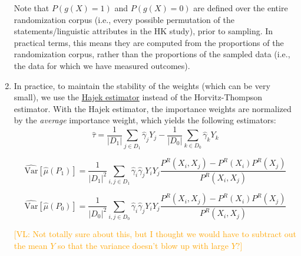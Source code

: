 \documentclass{article}
\newcommand{\vl}[1]{\textcolor{orange}{[VL: #1]}}
\begin{document}
\begin{enumerate}
    Note that $P(g(X)=1)$ and $P(g(X)=0)$ are defined over the entire randomization corpus (i.e., every possible permutation of the statements/linguistic attributes in the HK study), prior to sampling. In practical terms, this means they are computed from the  proportions of the randomization corpus, rather than the  proportions of the sampled data (i.e., the data for which we have measured outcomes).
    \item In practice, to maintain the stability of the weights (which can be very small), we use the \href{https://cran.r-project.org/web/packages/sampling/vignettes/HT_Hajek_estimators.pdf}{Hajek estimator} instead of the Horvitz-Thompson estimator. With the Hajek estimator, the importance weights are normalized by the \textit{average} importance weight, which yields the following estimators:
    \begin{equation*}
        \hat{\tau} = \frac{1}{|D_1|} \sum_{j \in D_1} \hat{\gamma}_j Y_j - \frac{1}{|D_0|} \sum_{k \in D_0} \hat{\gamma}_k Y_k
    \end{equation*}
    

    \begin{equation*}
        \widehat{\text{Var}}[\hat{\mu}(P_1)] = \frac{1}{|D_1|^2} \sum_{i,j \in D_1} \hat{\gamma}_i \hat{\gamma}_j Y_iY_j \frac{P^R(X_i,X_j)-P^R(X_i)P^R(X_j)}{P^R(X_i,X_j)}
    \end{equation*}
    

    \begin{equation*}
        \widehat{\text{Var}}[\hat{\mu}(P_0)] = \frac{1}{|D_0|^2} \sum_{i,j \in D_0} \hat{\gamma}_i \hat{\gamma}_j Y_iY_j \frac{P^R(X_i,X_j)-P^R(X_i)P^R(X_j)}{P^R(X_i,X_j)}
    \end{equation*}

    \vl{Not totally sure about this, but I thought we would have to subtract out the mean $Y$ so that the variance doesn't blow up with large $Y$?}
    

\end{enumerate}
\end{document}

